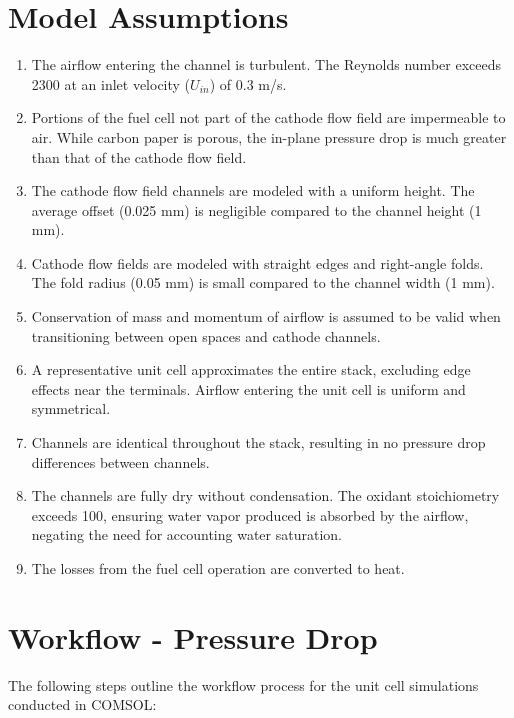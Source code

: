 \section{Model Assumptions}
    \begin{enumerate}
        \item The airflow entering the channel is turbulent. The Reynolds number exceeds 2300 at an inlet velocity ($U_{in}$) of 0.3 m/s.
        \item Portions of the fuel cell not part of the cathode flow field are impermeable to air. While carbon paper is porous, the in-plane pressure drop is much greater than that of the cathode flow field.
        \item The cathode flow field channels are modeled with a uniform height. The average offset (0.025 mm) is negligible compared to the channel height (1 mm).
        \item Cathode flow fields are modeled with straight edges and right-angle folds. The fold radius (0.05 mm) is small compared to the channel width (1 mm).
        \item Conservation of mass and momentum of airflow is assumed to be valid when transitioning between open spaces and cathode channels.
        \item A representative unit cell approximates the entire stack, excluding edge effects near the terminals. Airflow entering the unit cell is uniform and symmetrical.
        \item Channels are identical throughout the stack, resulting in no pressure drop differences between channels.
        \item The channels are fully dry without condensation. The oxidant stoichiometry exceeds 100, ensuring water vapor produced is absorbed by the airflow, negating the need for accounting water saturation.
        \item The losses from the fuel cell operation are converted to heat. 
    \end{enumerate}

    \section{Workflow - Pressure Drop}
    The following steps outline the workflow process for the unit cell simulations conducted in COMSOL:

